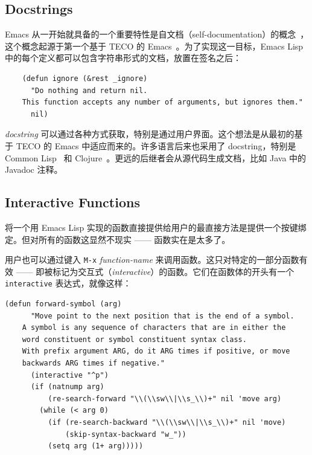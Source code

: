 \documentclass[format=acmsmall,screen]{acmart}
\begin{document}
\subsection{Docstrings}
\label{sec:docstrings}

Emacs 从一开始就具备的一个重要特性是自文档（self-documentation）的概念~\cite{Stallman1981}，这个概念起源于第一个基于 TECO 的 Emacs~\cite{Stallman2018-personal}。为了实现这一目标，Emacs Lisp 中的每个定义都可以包含字符串形式的文档，放置在签名之后：
\begin{verbatim}
    (defun ignore (&rest _ignore)
      "Do nothing and return nil.
    This function accepts any number of arguments, but ignores them."
      nil)
\end{verbatim}
\emph{docstring} 可以通过各种方式获取，特别是通过用户界面。这个想法是从最初的基于 TECO 的 Emacs 中适应而来的。许多语言后来也采用了 docstring，特别是 Common Lisp~\cite{HyperSpec} 和 Clojure~\cite{ClojureDotOrg}。更远的后继者会从源代码生成文档，比如 Java 中的 Javadoc 注释。

\subsection{Interactive Functions}
\label{sec:interactive-functions}

将一个用 Emacs Lisp 实现的函数直接提供给用户的最直接方法是提供一个按键绑定。但对所有的函数这显然不现实 —— 函数实在是太多了。

用户也可以通过键入 \texttt{M-x} \emph{function-name} 来调用函数。这只对特定的一部分函数有效 —— 即被标记为交互式（\emph{interactive}）的函数。它们在函数体的开头有一个 \texttt{interactive} 表达式，就像这样：
\begin{Verbatim}[samepage=true]
    (defun forward-symbol (arg)
      "Move point to the next position that is the end of a symbol.
    A symbol is any sequence of characters that are in either the
    word constituent or symbol constituent syntax class.
    With prefix argument ARG, do it ARG times if positive, or move
    backwards ARG times if negative."
      (interactive "^p")
      (if (natnump arg)
          (re-search-forward "\\(\\sw\\|\\s_\\)+" nil 'move arg)
        (while (< arg 0)
          (if (re-search-backward "\\(\\sw\\|\\s_\\)+" nil 'move)
              (skip-syntax-backward "w_"))
          (setq arg (1+ arg)))))
\end{Verbatim}
\end{document}
